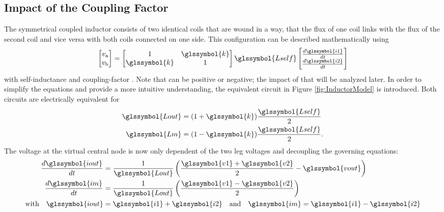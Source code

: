 \documentclass{IPEC2026}
\newcommand{\sbl}[1]{\glssymbol{#1}}
\begin{document}
\subsection{Impact of the Coupling Factor}
The symmetrical coupled inductor consists of two identical coils that are wound in a way, that the flux of one coil links with the flux of the second coil and vice versa with both coils connected on one side. This configuration can be described mathematically using 
\begin{equation}
  \label{eq:StandardCoupling}
  \begin{bmatrix} v_\mathrm a \\ v_\mathrm b \end{bmatrix} = \begin{bmatrix} 1 & \sbl{k} \\ \sbl{k} & 1 \end{bmatrix} \sbl{Lself} \begin{bmatrix} \frac{d\sbl{i1}}{dt}  \\ \frac{d\sbl{i2}}{dt} \end{bmatrix}
\end{equation}
with self-inductance \sbl{Lself} and coupling-factor \sbl{k}. Note that \sbl{k} can be positive or negative; the impact of that will be analyzed later.
In order to simplify the equations and provide a more intuitive understanding, the equivalent circuit in Figure \ref{fig:InductorModel} is introduced. Both circuits are electrically equivalent for
\begin{equation}
  \label{eq:LoutandLmfromk}
  \begin{aligned}
    \sbl{Lout} & = (1+\sbl{k})\frac{\sbl{Lself}}{2} \\
    \sbl{Lm} & = (1-\sbl{k})\frac{\sbl{Lself}}{2}.
  \end{aligned}
\end{equation}
The voltage at the virtual central node is now only dependent of the two leg voltages \sbl{v1} and \sbl{v2} decoupling the governing equations:
\begin{equation}
  \label{eq:TransformerModel}
  \begin{aligned}
    \frac{d\sbl{iout}}{dt} &= \frac{1}{\sbl{Lout}} \left (\frac{\sbl{v1} + \sbl{v2}}{2}-\sbl{vout} \right ) \\
    \frac{d\sbl{im}}{dt} &= \frac{1}{\sbl{Lout}} \left (\frac{\sbl{v1} - \sbl{v2}}{2} \right ) \\
    \text{with} \quad \sbl{iout} &= \sbl{i1} + \sbl{i2} \quad \text{and} \quad \sbl{im} = \sbl{i1} - \sbl{i2}
  \end{aligned}
\end{equation}
\end{document}
